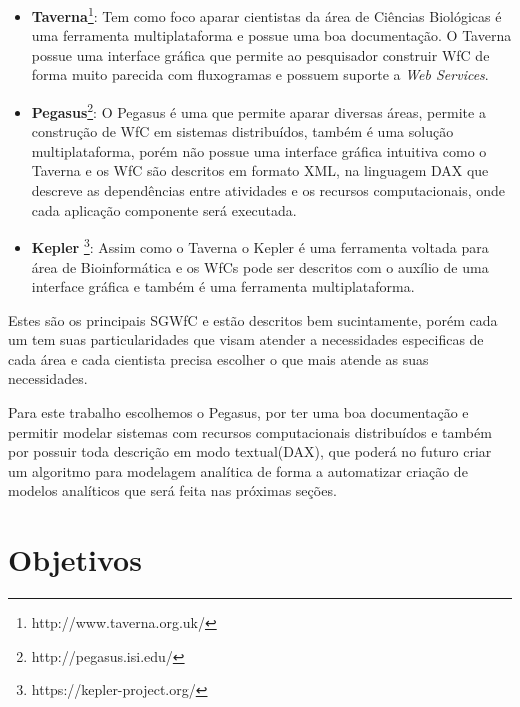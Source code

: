 \documentclass[a4paper,10pt]{article}
\begin{document}
	\begin{itemize}
	
		\item \textbf{Taverna}\footnote{http://www.taverna.org.uk/}: Tem como foco aparar cientistas da área de Ciências Biológicas é uma ferramenta multiplataforma e possue uma boa documentação. O Taverna possue uma interface gráfica que permite ao pesquisador construir WfC de forma muito parecida com fluxogramas e possuem suporte a \textit{Web Services}.

		\item \textbf{Pegasus}\footnote{http://pegasus.isi.edu/}: O Pegasus é uma que permite aparar diversas áreas, permite a construção de WfC em sistemas distribuídos, também é uma solução multiplataforma, porém não possue uma interface gráfica intuitiva como o Taverna e os WfC são descritos em formato XML, na linguagem DAX que descreve as dependências entre atividades e os recursos computacionais, onde cada aplicação componente será executada.

		\item \textbf{Kepler} \footnote{https://kepler-project.org/}: Assim como o Taverna o Kepler é uma ferramenta voltada para área de Bioinformática e os WfCs pode ser descritos com o auxílio de uma interface gráfica e também é uma ferramenta multiplataforma.

	\end{itemize}
	
	Estes são os principais SGWfC e estão descritos bem sucintamente, porém cada um tem suas particularidades que visam atender a necessidades especificas de cada área e cada cientista precisa escolher o que mais atende as suas necessidades. 

		Para este trabalho escolhemos o Pegasus, por ter uma boa documentação e permitir modelar sistemas com recursos computacionais distribuídos e também por possuir toda descrição em modo textual(DAX), que poderá no futuro criar um algoritmo para modelagem analítica de forma a automatizar criação de modelos analíticos que será feita nas próximas seções.

\section*{Objetivos}

\end{document}
